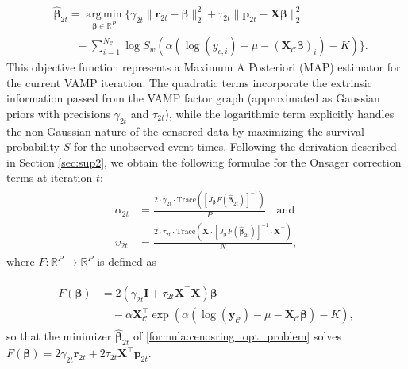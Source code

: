 \begin{equation}
\label{formula:cenosring_opt_problem}
\begin{split}
& \hat{\bm{\beta}}_{2t} = \operatorname*{arg\,min}_{\bm{\beta} \in \mathbb{R}^P} \Bigg\{ \gamma_{2t} \| \bm{r}_{2t} - \bm{\beta} \|_2^2 + \tau_{2t} \| \bm{p}_{2t} - \bm{X} \bm{\beta} \|_2^2 \\
& \qquad - \sum_{i=1}^{N_{\mathcal C}} \log S_w\left(\alpha\left(\log(y_{c,i}) - \mu - (\bm{X}_\mathcal{C} \bm{\beta})_i \right) -K \right) \Bigg\}.
\end{split}
\end{equation} 
This objective function represents a Maximum A Posteriori (MAP) estimator for the current VAMP iteration. The quadratic terms incorporate the extrinsic information passed from the VAMP factor graph (approximated as Gaussian priors with precisions $\gamma_{2t}$ and $\tau_{2t}$), while the logarithmic term explicitly handles the non-Gaussian nature of the censored data by maximizing the survival probability $S$ for the unobserved event times. Following the derivation described in Section \ref{sec:sup2}, we obtain the following formulae for the Onsager correction terms at iteration $t$: 
\begin{align}
    \begin{split}
    \alpha_{2t} & = \frac{2 \cdot \gamma_{2t} \cdot \text{Trace}([J_{\bm{\beta}}F(\hat{\bm{\beta}}_{2t})]^{-1})}{P} \quad \text{and} \\
    \upsilon_{2t} & = \frac{2 \cdot \tau_{2t} \cdot \text{Trace}(\bm{X} \cdot [J_{\bm{\beta}}F(\hat{\bm{\beta}}_{2t})]^{-1} \cdot \bm{X}^\top)}{N},
    \end{split}
\end{align}
where $F:\mathbb{R}^P \to \mathbb{R}^P$ is defined as

\begin{align}
    \begin{split}
    F(\bm{\beta}) & = 2(\gamma_{2t}\bm{I} + \tau_{2t}\bm{X}^\top\bm{X})\bm{\beta} \\
    & \quad - \alpha \bm{X}_\mathcal{C}^\top \exp\left(\alpha(\log(\bm{y}_\mathcal{C}) - \mu - \bm{X}_\mathcal{C} \bm{\beta})-K\right),
    \end{split}
\end{align}
so that the minimizer $\hat{\bm{\beta}}_{2t}$ of \eqref{formula:cenosring_opt_problem} solves $F(\bm{\beta}) = 2 \gamma_{2t} \bm{r}_{2t} + 2 \tau_{2t} \bm{X}^\top \bm{p}_{2t}$.

